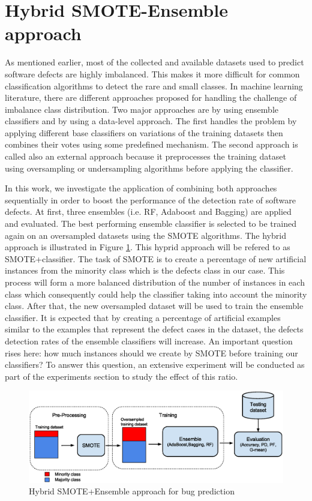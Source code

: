\documentclass[runningheads,a4paper]{llncs}
\begin{document}
\section{Hybrid SMOTE-Ensemble approach}
\label{SMOTE-Ensemble}

As mentioned earlier, most of the collected and available datasets used to predict software defects are highly imbalanced. This makes it more difficult for common classification algorithms to detect the rare and small classes. In machine learning literature, there are different approaches proposed for handling the challenge of imbalance class distribution. Two major approaches are by using ensemble classifiers and by using a data-level approach. The first handles the problem by applying different base classifiers on variations of the training datasets then combines their votes using some predefined mechanism. The second approach is called also an external approach because it preprocesses the training dataset using oversampling or undersampling algorithms before applying the classifier. 

In this work, we investigate the application of combining both approaches sequentially in order to boost the performance of the detection rate of software defects. At first, three ensembles (i.e. RF, Adaboost and Bagging) are applied and evaluated. The best performing ensemble classifier is selected to be trained again on an oversampled datasets using the SMOTE algorithms. The hybrid approach is illustrated in Figure \ref{fig:fig1}. This hyprid approach will be refered to as SMOTE+classifier. The task of SMOTE is to create a percentage of new artificial instances from the minority class which is the defects class in our case. This process will form a more balanced distribution of the number of instances in each class which consequently could help the classifier taking into account the minority class. After that, the new oversampled dataset will be used to train the ensemble classifier. It is expected that by creating a percentage of artificial examples similar to the examples that represent the defect cases in the dataset, the defects detection rates of the ensemble classifiers will increase. An important question rises here: how much instances should we create by SMOTE before training our classifiers? To answer this question, an extensive experiment will be conducted as part of the experiments section to study the effect of this ratio.
 

\begin{figure}[H]
\centering
\includegraphics[scale=0.50]{Framework.eps}
\caption{Hybrid SMOTE+Ensemble approach for bug prediction}
\label{fig:fig1}
\end{figure}
\end{document}
